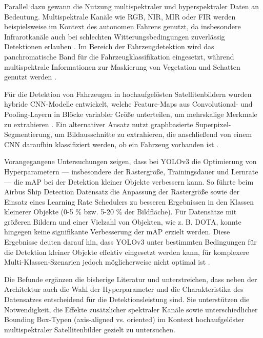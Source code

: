 Parallel dazu gewann die Nutzung multispektraler und hyperspektraler Daten an Bedeutung. Multispektrale Kanäle wie \acrshort{RGB}, \acrshort{NIR}, \Acrfull{MIR} oder \Acrfull{FIR} werden beispielsweise im Kontext des autonomen Fahrens genutzt, da insbesondere Infrarotkanäle auch bei schlechten Witterungsbedingungen zuverlässig Detektionen erlauben \cite{Takumi2017}. Im Bereich der Fahrzeugdetektion wird das panchromatische Band für die Fahrzeugklassifikation eingesetzt, während multispektrale Informationen zur Maskierung von Vegetation und Schatten genutzt werden \cite{Eikvil2009}.

Für die Detektion von Fahrzeugen in hochaufgelösten Satellitenbildern wurden hybride \acrshort{CNN}-Modelle entwickelt, welche Feature-Maps aus Convolutional- und Pooling-Layern in Blöcke variabler Größe unterteilen, um mehrskalige Merkmale zu extrahieren \cite{XueyunChen2014}. Ein alternativer Ansatz nutzt graphbasierte Superpixel-Segmentierung, um Bildausschnitte zu extrahieren, die anschließend von einem \acrshort{CNN} daraufhin klassifiziert werden, ob ein Fahrzeug vorhanden ist \cite{Jiang2015}.

Vorangegangene Untersuchungen zeigen, dass bei \acrshort{YOLO}v3 die Optimierung von Hyperparametern  — insbesondere der Rastergröße, Trainingsdauer und Lernrate — die \acrfull{mAP} bei der Detektion kleiner Objekte verbessern kann. So führte beim Airbus Ship Detection Datensatz \cite{Airbus_Ship_Det} die Anpassung der Rastergröße sowie der Einsatz eines Learning Rate Schedulers zu besseren Ergebnissen in den Klassen kleinerer Objekte (0-5 \% bzw. 5-20 \% der Bildfläche). Für Datensätze mit größeren Bildern und einer Vielzahl von Objekten, wie z. B. \acrshort{DOTA}, konnte hingegen keine signifikante Verbesserung der \acrshort{mAP} erzielt werden. Diese Ergebnisse deuten darauf hin, dass \acrshort{YOLO}v3 unter bestimmten Bedingungen für die Detektion kleiner Objekte effektiv eingesetzt werden kann, für komplexere Multi-Klassen-Szenarien jedoch möglicherweise nicht optimal ist \cite{Balzer2022}.

Die Befunde ergänzen die bisherige Literatur und unterstreichen, dass neben der Architektur auch die Wahl der Hyperparameter und die Charakteristika des Datensatzes entscheidend für die Detektionsleistung sind. Sie unterstützen die Notwendigkeit, die Effekte zusätzlicher spektraler Kanäle sowie unterschiedlicher Bounding Box-Typen (axis-aligned vs. oriented) im Kontext hochaufgelöster multispektraler Satellitenbilder gezielt zu untersuchen.

